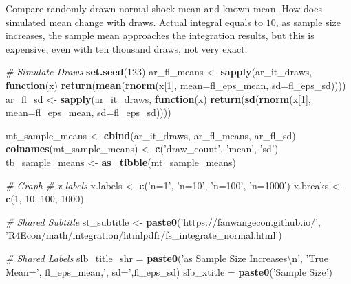 \documentclass[
]{book}
\newenvironment{Shaded}{\begin{snugshade}}{\end{snugshade}}
\newcommand{\CharTok}[1]{\textcolor[rgb]{0.31,0.60,0.02}{#1}}
\newcommand{\CommentTok}[1]{\textcolor[rgb]{0.56,0.35,0.01}{\textit{#1}}}
\newcommand{\ControlFlowTok}[1]{\textcolor[rgb]{0.13,0.29,0.53}{\textbf{#1}}}
\newcommand{\DataTypeTok}[1]{\textcolor[rgb]{0.13,0.29,0.53}{#1}}
\newcommand{\DecValTok}[1]{\textcolor[rgb]{0.00,0.00,0.81}{#1}}
\newcommand{\KeywordTok}[1]{\textcolor[rgb]{0.13,0.29,0.53}{\textbf{#1}}}
\newcommand{\NormalTok}[1]{#1}
\newcommand{\StringTok}[1]{\textcolor[rgb]{0.31,0.60,0.02}{#1}}
\begin{document}
Compare randomly drawn normal shock mean and known mean. How does simulated mean change with draws. Actual integral equals to \(10\), as sample size increases, the sample mean approaches the integration results, but this is expensive, even with ten thousand draws, not very exact.

\begin{Shaded}
\begin{Highlighting}[]
\CommentTok{# Simulate Draws}
\KeywordTok{set.seed}\NormalTok{(}\DecValTok{123}\NormalTok{)}
\NormalTok{ar_fl_means <-}
\StringTok{  }\KeywordTok{sapply}\NormalTok{(ar_it_draws, }\ControlFlowTok{function}\NormalTok{(x)}
    \KeywordTok{return}\NormalTok{(}\KeywordTok{mean}\NormalTok{(}\KeywordTok{rnorm}\NormalTok{(x[}\DecValTok{1}\NormalTok{], }\DataTypeTok{mean=}\NormalTok{fl_eps_mean, }\DataTypeTok{sd=}\NormalTok{fl_eps_sd))))}
\NormalTok{ar_fl_sd <-}
\StringTok{  }\KeywordTok{sapply}\NormalTok{(ar_it_draws, }\ControlFlowTok{function}\NormalTok{(x)}
    \KeywordTok{return}\NormalTok{(}\KeywordTok{sd}\NormalTok{(}\KeywordTok{rnorm}\NormalTok{(x[}\DecValTok{1}\NormalTok{], }\DataTypeTok{mean=}\NormalTok{fl_eps_mean, }\DataTypeTok{sd=}\NormalTok{fl_eps_sd))))}

\NormalTok{mt_sample_means <-}\StringTok{ }\KeywordTok{cbind}\NormalTok{(ar_it_draws, ar_fl_means, ar_fl_sd)}
\KeywordTok{colnames}\NormalTok{(mt_sample_means) <-}\StringTok{ }\KeywordTok{c}\NormalTok{(}\StringTok{'draw_count'}\NormalTok{, }\StringTok{'mean'}\NormalTok{, }\StringTok{'sd'}\NormalTok{)}
\NormalTok{tb_sample_means <-}\StringTok{ }\KeywordTok{as_tibble}\NormalTok{(mt_sample_means)}

\CommentTok{# Graph}
\CommentTok{# x-labels}
\NormalTok{x.labels <-}\StringTok{ }\KeywordTok{c}\NormalTok{(}\StringTok{'n=1'}\NormalTok{, }\StringTok{'n=10'}\NormalTok{, }\StringTok{'n=100'}\NormalTok{, }\StringTok{'n=1000'}\NormalTok{)}
\NormalTok{x.breaks <-}\StringTok{ }\KeywordTok{c}\NormalTok{(}\DecValTok{1}\NormalTok{, }\DecValTok{10}\NormalTok{, }\DecValTok{100}\NormalTok{, }\DecValTok{1000}\NormalTok{)}

\CommentTok{# Shared Subtitle}
\NormalTok{st_subtitle <-}\StringTok{ }\KeywordTok{paste0}\NormalTok{(}\StringTok{'https://fanwangecon.github.io/'}\NormalTok{,}
                      \StringTok{'R4Econ/math/integration/htmlpdfr/fs_integrate_normal.html'}\NormalTok{)}

\CommentTok{# Shared Labels}
\NormalTok{slb_title_shr =}\StringTok{ }\KeywordTok{paste0}\NormalTok{(}\StringTok{'as Sample Size Increases}\CharTok{\textbackslash{}n}\StringTok{'}\NormalTok{,}
                       \StringTok{'True Mean='}\NormalTok{, fl_eps_mean,}\StringTok{', sd='}\NormalTok{,fl_eps_sd)}
\NormalTok{slb_xtitle =}\StringTok{ }\KeywordTok{paste0}\NormalTok{(}\StringTok{'Sample Size'}\NormalTok{)}


\end{Highlighting}
\end{Shaded}
\end{document}
